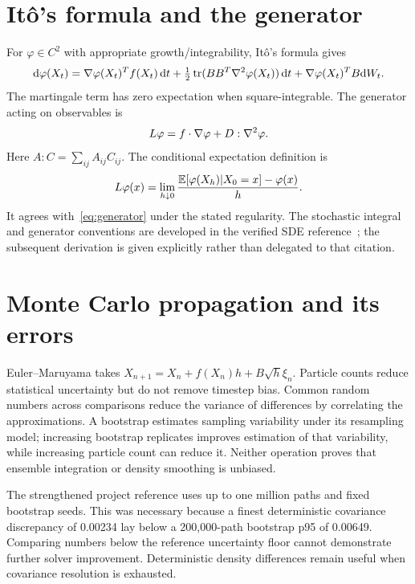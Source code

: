 \section{It\^o's formula and the generator}
For $\varphi\in C^2$ with appropriate growth/integrability, It\^o's formula gives
\begin{equation}\label{eq:ito}
\mathrm d\varphi(X_t)=\nabla\varphi(X_t)^Tf(X_t)\,\mathrm d t
+\tfrac12\operatorname{tr}(BB^T\nabla^2\varphi(X_t))\,\mathrm d t
+\nabla\varphi(X_t)^TB\mathrm dW_t.
\end{equation}
The martingale term has zero expectation when square-integrable. The generator acting on observables is
\begin{equation}\label{eq:generator}
L\varphi=f\cdot\nabla\varphi+D:\nabla^2\varphi.
\end{equation}
Here $A:C=\sum_{ij}A_{ij}C_{ij}$. The conditional expectation definition is
\begin{equation}
 L\varphi(x)=\lim_{h\downarrow0}\frac{\mathbb E[\varphi(X_h)|X_0=x]-\varphi(x)}h.
\end{equation}
It agrees with~\eqref{eq:generator} under the stated regularity. The stochastic integral and generator conventions are developed in the verified SDE reference~\cite{sarkka}; the subsequent derivation is given explicitly rather than delegated to that citation.

\section{Monte Carlo propagation and its errors}
Euler--Maruyama takes $X_{n+1}=X_n+f(X_n)h+B\sqrt h\xi_n$. Particle counts reduce statistical uncertainty but do not remove timestep bias. Common random numbers across comparisons reduce the variance of differences by correlating the approximations. A bootstrap estimates sampling variability under its resampling model; increasing bootstrap replicates improves estimation of that variability, while increasing particle count can reduce it. Neither operation proves that ensemble integration or density smoothing is unbiased.

The strengthened project reference uses up to one million paths and fixed bootstrap seeds. This was necessary because a finest deterministic covariance discrepancy of 0.00234 lay below a 200,000-path bootstrap p95 of 0.00649. Comparing numbers below the reference uncertainty floor cannot demonstrate further solver improvement. Deterministic density differences remain useful when covariance resolution is exhausted.

